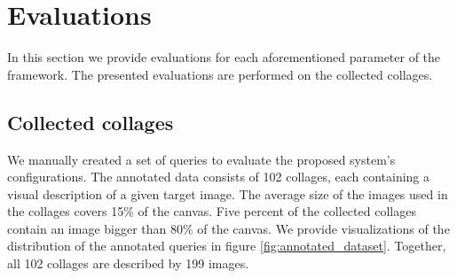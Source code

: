 
\chapter{Evaluations}

In this section we provide evaluations for each aforementioned parameter of the framework. The presented evaluations are performed on the collected collages.

\section{Collected collages}

We manually created a set of queries to evaluate the proposed system's configurations. The annotated data consists of 102 collages, each containing a visual description of a given target image. The average size of the images used in the collages covers 15\% of the canvas. Five percent of the collected collages contain an image bigger than 80\% of the canvas. We provide visualizations of the distribution of the annotated queries in figure \ref{fig:annotated_dataset}. Together, all 102 collages are described by 199 images.

